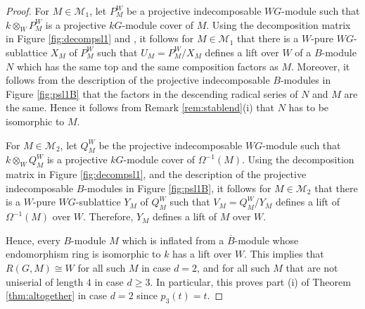 \documentclass{amsart}
\theoremstyle{plain}
\theoremstyle{definition}
\theoremstyle{remark}
\begin{document}
\begin{proof}
For $M\in\mathcal{M}_1$, let $P^W_M$ be a projective indecomposable $WG$-module
such that $k\otimes_WP^W_M$ is a projective $kG$-module cover of $M$.
Using the decomposition matrix in Figure \ref{fig:decompsl1} and \cite[Prop. (23.7)]{CR}, it follows
for $M\in\mathcal{M}_1$
that there is a $W$-pure $WG$-sublattice $X_M$ of  $P^W_M$
such that $U_M=P^W_M/X_M$ defines a lift over $W$ of a $B$-module $N$ which has 
the same top and the same composition factors as $M$. Moreover, it follows from the
description of the projective indecomposable $B$-modules in Figure \ref{fig:psl1B} that 
the factors in the descending radical series of $N$ and $M$ are the same.
Hence it follows from Remark \ref{rem:stablend}(i) that $N$ has to be isomorphic to $M$.

For $M\in\mathcal{M}_2$, let $Q^W_M$ be the projective indecomposable $WG$-module
such that $k\otimes_WQ^W_M$ is a projective $kG$-module cover of $\Omega^{-1}(M)$. 
Using the decomposition matrix in Figure \ref{fig:decompsl1}, \cite[Prop. (23.7)]{CR}
and the description of the projective indecomposable $B$-modules in Figure \ref{fig:psl1B}, 
it follows for $M\in\mathcal{M}_2$
that there is a $W$-pure $WG$-sublattice $Y_M$ of  $Q^W_M$
such that $V_M=Q^W_M/Y_M$ defines a lift of $\Omega^{-1}(M)$ over $W$.
Therefore, $Y_M$ defines a lift of $M$ over $W$.

Hence, every 
$B$-module $M$ which is inflated from a $\overline{B}$-module whose endomorphism ring 
is isomorphic to $k$ has a lift over $W$. This implies that  $R(G,M)\cong W$ 
for all such $M$ in case $d=2$, and for all such $M$ that are not uniserial of length $4$
in case $d\ge 3$.
In particular, this proves part (i) of Theorem \ref{thm:altogether} in case $d=2$ since
$p_3(t)=t$.


\end{proof}
\end{document}
